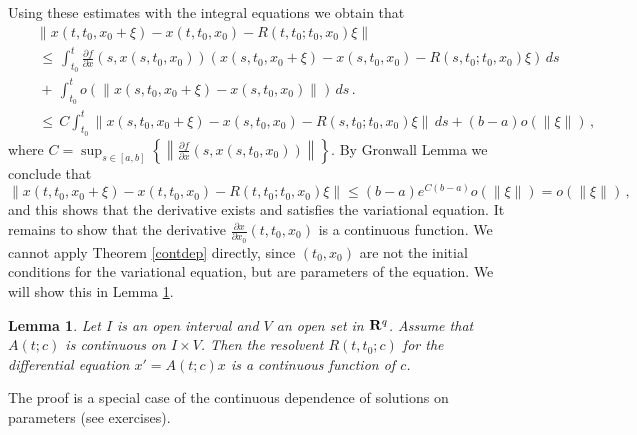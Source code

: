 \documentclass[12pt]{report}
\newcommand{\bR}{{\bf R}}
\newtheorem{lemma}[theorem]{Lemma}
\newcommand{\proof}{\noindent {\em Proof:~}}
\newcommand{\nn}{\nonumber}
\def\qed{\hbox{\hskip 6pt\vrule width6pt height7pt depth1pt
    \hskip1pt}\bigskip}
\begin{document}
Using these estimates with the integral equations we obtain that 
\begin{eqnarray}
&& \| x(t,t_0,x_0+\xi) - x(t,t_0,x_0) - R(t,t_0;t_0,x_0)\xi \| \nn \\
&& \!\!\,\le \,\int_{t_0}^t \frac{\partial f}{\partial x} (s,
x(s,t_0,x_0)) ( x(s,t_0,x_0+\xi) - x(s,t_0,x_0) - R(s,t_0;t_0,x_0)\xi)
\,ds \nn \\
&& \!\!\! \,+\,\int_{t_0}^t o( \|x(s,t_0,x_0+\xi) - x(s,t_0,x_0)\|) \,ds \,. \nn \\
&& \,\le \, C \int_{t_0}^t \|  x(s,t_0,x_0+\xi) - x(s,t_0,x_0) - 
R(s,t_0;t_0,x_0)\xi \| \,ds  +  (b-a) o(\|\xi\|) \,, \nn
\end{eqnarray}  
where $C = \sup_{ s \in [a,b]} \left\{ \left\| \frac{\partial f}{\partial x} 
(s,x(s,t_0,x_0))\right \| \right\}$. 
By Gronwall Lemma we conclude that 
\begin{equation}
\| x(t,t_0,x_0+\xi) - x(t,t_0,x_0) - R(t,t_0;t_0,x_0)\xi \| \le 
(b-a) e^{C(b-a)} o(\|\xi\|)=o(\|\xi\|) \,,
\end{equation}
and this shows that the derivative exists and satisfies the variational 
equation.  It remains to show that the derivative 
$\frac{\partial x}{\partial x_0}(t,t_0,x_0)$ is a continuous function. 
We cannot apply Theorem \ref{contdep} directly, 
since $(t_0,x_0)$ are not the initial conditions for 
the variational equation, but are parameters of the equation. 
We will show this in Lemma \ref{supplem}. \hfill \qed
 
\begin{lemma}\label{supplem} Let $I$ is an open interval and
$V$ an open set in $\bR^q$. Assume that $A(t;c)$ is continuous on $I
\times V$.  Then the resolvent $R(t,t_0;c)$ for the differential
equation $x'=A(t;c)x$ is a continuous function of $c$.
\end{lemma}

\proof  The proof is a special case of the continuous dependence of solutions on parameters (see exercises). 
 
\end{document}
